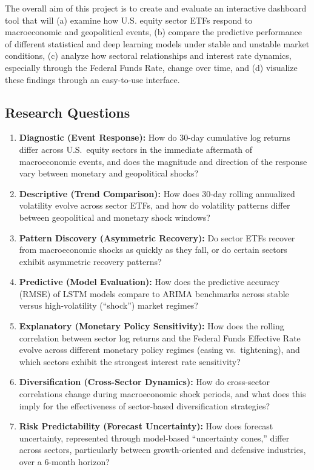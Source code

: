 \documentclass[12pt]{article}
\begin{document}
The overall aim of this project is to create and evaluate an interactive dashboard tool that will (a) examine how U.S. equity sector ETFs respond to macroeconomic and geopolitical events, (b) compare the predictive performance of different statistical and deep learning models under stable and unstable market conditions, (c) analyze how sectoral relationships and interest rate dynamics, especially through the Federal Funds Rate, change over time, and (d) visualize these findings through an easy-to-use interface.

\subsection{Research Questions}

\begin{enumerate}

    \item \textbf{Diagnostic (Event Response):} How do 30-day cumulative log returns differ across U.S.\ equity sectors in the immediate aftermath of macroeconomic events, and does the magnitude and direction of the response vary between monetary and geopolitical shocks?

    \item \textbf{Descriptive (Trend Comparison):} How does 30-day rolling annualized volatility evolve across sector ETFs, and how do volatility patterns differ between geopolitical and monetary shock windows?

    \item \textbf{Pattern Discovery (Asymmetric Recovery):} Do sector ETFs recover from macroeconomic shocks as quickly as they fall, or do certain sectors exhibit asymmetric recovery patterns?

    \item \textbf{Predictive (Model Evaluation):} How does the predictive accuracy (RMSE) of LSTM models compare to ARIMA benchmarks across stable versus high-volatility (“shock”) market regimes?

    \item \textbf{Explanatory (Monetary Policy Sensitivity):} How does the rolling correlation between sector log returns and the Federal Funds Effective Rate evolve across different monetary policy regimes (easing vs.\ tightening),  and which sectors exhibit the strongest interest rate sensitivity?

    \item \textbf{Diversification (Cross-Sector Dynamics):} How do cross-sector correlations change during macroeconomic shock periods, and what does this imply for the effectiveness of sector-based diversification strategies?

    \item \textbf{Risk Predictability (Forecast Uncertainty):} How does forecast uncertainty, represented through model-based “uncertainty cones,” differ across sectors, particularly between growth-oriented and defensive industries, over a 6-month horizon?

\end{enumerate}
\end{document}
